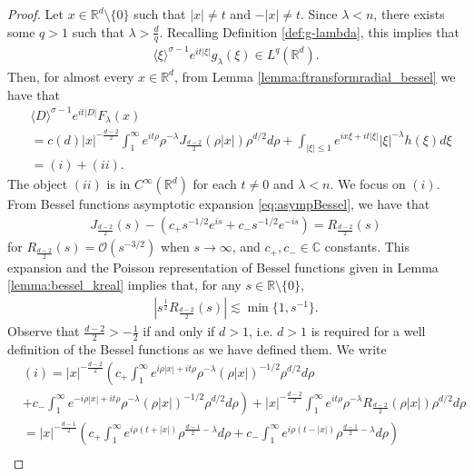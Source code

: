 \documentclass[a4paper, reqno, 11pt]{amsart}
\theoremstyle{definition}
\begin{document}
\begin{proof}
Let $x \in \mathbb{R}^d \setminus \{0\}$ such that $|x| \neq t$ and $-|x| \neq t$. Since $\lambda < n$, there exists some $q > 1$ such that $\lambda > \frac{d}{q}$. Recalling Definition \ref{def:g-lambda}, this implies that 
\begin{align*}
\langle \xi \rangle^{\sigma-1} e^{it|\xi|} g_{\lambda}(\xi) \in L^q(\mathbb{R}^d).
\end{align*}
Then, for almost every $x \in \mathbb{R}^d$, from Lemma \ref{lemma:ftransformradial_bessel} we have that
\begin{align*}
&\langle D \rangle^{\sigma-1} e^{it|D|} F_{\lambda}(x) \nonumber \\
&=c(d) |x|^{-\frac{d-2}{2}} \int_1^{\infty}  e^{it\rho}  \rho^{-\lambda} J_{\frac{d-2}{2}}(\rho|x|) \rho^{d/2} d\rho + \int_{|\xi| \leq 1} e^{ix\xi + it|\xi|} |\xi|^{-\lambda} h(\xi) d\xi \nonumber \\
&=(i) + (ii).  
\end{align*}
The object $(ii)$ is in $C^{\infty}(\mathbb{R}^d)$ for each $t \neq 0$ and $\lambda < n$. We focus on $(i)$. From Bessel functions asymptotic expansion \eqref{eq:asympBessel}, we have that
\begin{align*}
J_{\frac{d-2}{2}}(s)  - \left( c_+ s^{-1/2} e^{is} + c_- s^{-1/2} e^{-is} \right) = R_{\frac{d-2}{2}}(s)
\end{align*}
for $R_{\frac{d-2}{2}}(s) = \mathcal{O}(s^{-3/2})$ when $s \rightarrow \infty$, and 
$c_+, c_- \in \mathbb{C}$ constants. This expansion and the Poisson representation of Bessel functions given in Lemma \ref{lemma:bessel_kreal} implies that, for any $s \in \mathbb{R} \setminus \{0\}$,
\begin{align}\label{eq:ourbessel-asymp}
|s^{\frac{1}{2}}R_{\frac{d-2}{2}}(s)| \lesssim \min\{ 1 , s^{-1} \}.
\end{align}
Observe that $\frac{d-2}{2} > -\frac{1}{2}$ if and only if $d > 1$, i.e. $d>1$ is required for a well definition of the Bessel functions as we have defined them. We write
\begin{align*}
&(i) = |x|^{-\frac{d-2}{2}} \left( c_+ \int_1^{\infty}  e^{i\rho|x| + it\rho} \rho^{-\lambda} (\rho|x|)^{-1/2} \rho^{d/2} d\rho \right.   \nonumber \\
&\left. + c_- \int_1^{\infty} e^{-i\rho|x| + it\rho} \rho^{-\lambda} (\rho|x|)^{-1/2} \rho^{d/2} d\rho \right) + |x|^{-\frac{d-2}{2}} \int_1^{\infty} e^{it\rho} \rho^{-\lambda} R_{\frac{d-2}{2}}(\rho|x|) \rho^{d/2} d\rho \nonumber \\
&= |x|^{-\frac{d-1}{2}} \left(c_+ \int_{1}^{\infty}  e^{i \rho ( t + |x|)}  \rho^{\frac{d-1}{2} - \lambda} d\rho + c_- \int_{1}^{\infty}  e^{i \rho( t - |x|)}  \rho^{\frac{d-1}{2} - \lambda} d\rho \right) \nonumber \\

\end{align*}
\end{proof}
\end{document}
